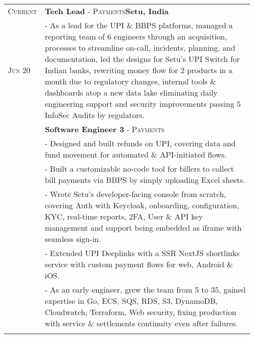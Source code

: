 \documentclass[a4paper,10pt]{extarticle} %
\begin{document}
\begin{tabularx}{\linewidth}{ l | X }

\textsc{Current} & \textbf{Tech Lead} \textsc{- Payments}\hfill\textbf{Setu, India}\\
\textsc{Jun 20} & {- As a lead for the UPI \& BBPS platforms, managed a reporting team of 6 engineers through an acquisition, processes to streamline on-call, incidents, planning, and documentation, led the designs for Setu's UPI Switch for Indian banks, rewriting money flow for 2 products in a month due to regulatory changes, internal tools \& dashboards atop a new data lake eliminating daily engineering support and security improvements passing 5 InfoSec Audits by regulators.}\\
& \textbf{Software Engineer 3} \textsc{- Payments}\\
& {- Designed and built refunds on UPI, covering data and fund movement for automated \& API-initiated flows.}\\
& {- Built a customizable no-code tool for billers to collect bill payments via BBPS by simply uploading Excel sheets.}\\
& {- Wrote Setu's developer-facing console from scratch, covering Auth with Keycloak, onboarding, configuration, KYC, real-time reports, 2FA, User \& API key management and support being embedded as iframe with seamless sign-in.}\\
& {- Extended UPI Deeplinks with a SSR NextJS shortlinks service with custom payment flows for web, Android \& iOS.}\\
& {- As an early engineer, grew the team from 5 to 35, gained expertise in Go, ECS, SQS, RDS, S3, DynamoDB, Cloudwatch, Terraform, Web security, fixing production with service \& settlements continuity even after failures.}\\
\multicolumn{2}{c}{} \\


\end{tabularx}
\end{document}

